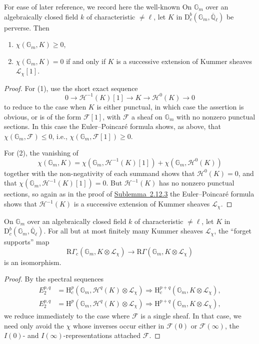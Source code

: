 For ease of later reference, we record here the well-known
On \(\mathbb{G}_m\) over an algebraically closed field \(k\) of characteristic
\(\ne\ell\), let \(K\) in
\(\mathrm{D}^b_c(\mathbb{G}_m,\overline{\mathbb{Q}}_\ell)\) be perverse. Then
\begin{enumerate}[label=(\arabic*)]
\item \(\chi(\mathbb{G}_m,K)\geq0\),
\item \(\chi(\mathbb{G}_m,K)=0\) if and only if \(K\) is a successive
extension of Kummer sheaves \(\mathcal{L}_\chi[1]\).
\end{enumerate}
\begin{proof}
For (1), use the short exact sequence
\[
  0\to\mathcal{H}^{-1}(K)[1]\to K\to\mathcal{H}^0(K)\to0
\]
to reduce to the case when \(K\) is either punctual, in which case the
assertion is obvious, or is of the form \(\mathcal{F}[1]\), with
\(\mathcal{F}\) a sheaf on \(\mathbb{G}_m\) with no nonzero punctual sections.
In this case the Euler--Poincaré formula shows, as above, that
\(\chi(\mathbb{G}_m,\mathcal{F})\leq0\), i.e.,
\(\chi(\mathbb{G}_m,\mathcal{F}[1])\geq0\).

For (2), the vanishing of
\[
  \chi(\mathbb{G}_m,K)
  =
  \chi(\mathbb{G}_m,\mathcal{H}^{-1}(K)[1])
  +\chi(\mathbb{G}_m,\mathcal{H}^0(K))
\]
together with the non-negativity of each summand shows that
\(\mathcal{H}^0(K)=0\), and that
\(\chi(\mathbb{G}_m,\mathcal{H}^{-1}(K)[1])=0\). But
\(\mathcal{H}^{-1}(K)\) has no nonzero punctual sections, so again as in the
proof of \hyperref[sublem:2.12.3]{Sublemma~2.12.3} the Euler--Poincaré formula
shows that \(\mathcal{H}^{-1}(K)\) is a successive extension of Kummer sheaves
\(\mathcal{L}_\chi\).
\end{proof}

On \(\mathbb{G}_m\) over an algebraically closed field \(k\) of characteristic
\(\ne\ell\), let \(K\) in
\(\mathrm{D}^b_c(\mathbb{G}_m,\overline{\mathbb{Q}}_\ell)\). For all but at
most finitely many Kummer sheaves \(\mathcal{L}_\chi\), the ``forget
supports'' map
\[
  \mathrm{R}\Gamma_c(\mathbb{G}_m,K\otimes\mathcal{L}_\chi)
  \to
  \mathrm{R}\Gamma(\mathbb{G}_m,K\otimes\mathcal{L}_\chi)
\]
is an isomorphism.
\begin{proof}
By the spectral sequences
\[
\begin{aligned}
  E_2^{p,q}
  &=\mathrm{H}^p_c(\mathbb{G}_m,\mathcal{H}^q(K)\otimes\mathcal{L}_\chi)
  \Rightarrow
  \mathrm{H}^{p+q}_c(\mathbb{G}_m,K\otimes\mathcal{L}_\chi),\\
  E_2^{p,q}
  &=\mathrm{H}^p(\mathbb{G}_m,\mathcal{H}^q(K)\otimes\mathcal{L}_\chi)
  \Rightarrow
  \mathrm{H}^{p+q}(\mathbb{G}_m,K\otimes\mathcal{L}_\chi),
\end{aligned}
\]
we reduce immediately to the case where \(\mathcal{F}\) is a single sheaf. In
that case, we need only avoid the \(\chi\) whose inverses occur either in
\(\mathcal{F}(0)\) or \(\mathcal{F}(\infty)\), the \(I(0)\)- and
\(I(\infty)\)-representations attached \(\mathcal{F}\).
\end{proof}

